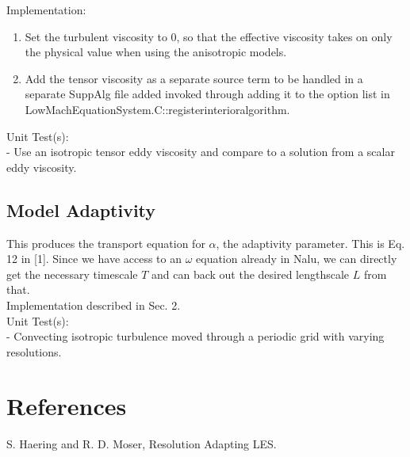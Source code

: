 \documentclass[12pt]{article}
\begin{document}
\noindent Implementation:
\begin{enumerate}
\item Set the turbulent viscosity to 0, so that the effective viscosity takes on only the physical value when using the anisotropic models.
\item Add the tensor viscosity as a separate source term to be handled in a separate SuppAlg file added invoked through adding it to the option list in LowMachEquationSystem.C::register\textunderscore interior\textunderscore algorithm.
\end{enumerate}

\noindent Unit Test(s): \\
- Use an isotropic tensor eddy viscosity and compare to a solution from a scalar eddy viscosity.



\subsection{Model Adaptivity}
This produces the transport equation for $\alpha$, the adaptivity parameter.  This is Eq. 12 in [1].  Since we have access to an $\omega$ equation already in Nalu, we can directly get the necessary timescale $T$ and can back out the desired lengthscale $L$ from that. \\

\noindent Implementation described in Sec. 2. \\

\noindent Unit Test(s): \\
- Convecting isotropic turbulence moved through a periodic grid with varying resolutions.

\section*{References}
\noindent [1] S. Haering and R. D. Moser, Resolution Adapting LES. \\
\end{document}
